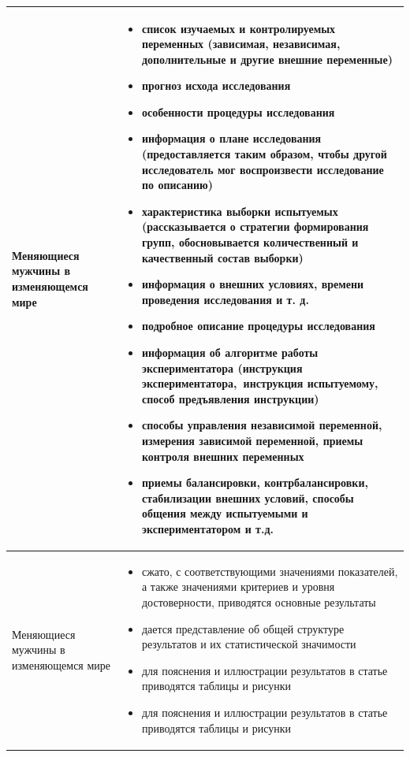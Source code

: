 \documentclass{../../common/thesisbyxetex}
\begin{document}
\begin{longtable}[t]{|P{0.25\textwidth}|P{0.65\textwidth}|}
Меняющиеся мужчины в изменяющемся мире &
\begin{itemize}
\item список изучаемых и контролируемых переменных (зависимая, независимая, дополнительные и другие внешние переменные)
\item прогноз исхода исследования
\item особенности процедуры исследования
\item информация о плане исследования (предоставляется таким образом, чтобы другой исследователь мог воспроизвести
исследование по описанию)
\item характеристика выборки испытуемых (рассказывается о стратегии формирования групп, обосновывается количественный и
качественный состав выборки)
\item информация о внешних условиях, времени проведения исследования и т. д.
\item подробное описание процедуры исследования
\item информация об алгоритме работы экспериментатора (инструкция экспериментатора, инструкция испытуемому, способ
предъявления инструкции)
\item способы управления независимой переменной, измерения зависимой переменной, приемы контроля внешних переменных
\item приемы балансировки, контрбалансировки, стабилизации внешних условий, способы общения между испытуемыми и
экспериментатором и т.д.

\end{itemize}
\\ \hline

Меняющиеся мужчины в изменяющемся мире &
\begin{itemize}
\item сжато, с соответствующими значениями показателей, а также значениями критериев и уровня достоверности, приводятся
основные результаты
\item дается представление об общей структуре результатов и их статистической значимости
\item для пояснения и иллюстрации результатов в статье приводятся таблицы и рисунки
\item для пояснения и иллюстрации результатов в статье приводятся таблицы и рисунки
\end{itemize}
\\ \hline



\end{longtable}
\end{document}
